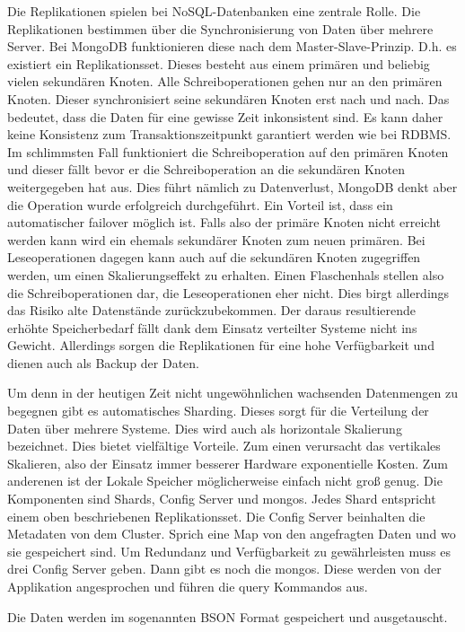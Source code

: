 \documentclass[]{article}
\begin{document}
Die Replikationen spielen bei NoSQL-Datenbanken eine zentrale Rolle. Die
Replikationen bestimmen über die Synchronisierung von Daten über mehrere
Server. Bei MongoDB funktionieren diese nach dem Master-Slave-Prinzip.
D.h. es existiert ein Replikationsset. Dieses besteht aus einem primären
und beliebig vielen sekundären Knoten. Alle Schreiboperationen gehen nur
an den primären Knoten. Dieser synchronisiert seine sekundären Knoten
erst nach und nach. Das bedeutet, dass die Daten für eine gewisse Zeit
inkonsistent sind. Es kann daher keine Konsistenz zum
Transaktionszeitpunkt garantiert werden wie bei RDBMS. Im schlimmsten
Fall funktioniert die Schreiboperation auf den primären Knoten und
dieser fällt bevor er die Schreiboperation an die sekundären Knoten
weitergegeben hat aus. Dies führt nämlich zu Datenverlust, MongoDB denkt
aber die Operation wurde erfolgreich durchgeführt. Ein Vorteil ist, dass
ein automatischer failover möglich ist. Falls also der primäre Knoten
nicht erreicht werden kann wird ein ehemals sekundärer Knoten zum neuen
primären. Bei Leseoperationen dagegen kann auch auf die sekundären
Knoten zugegriffen werden, um einen Skalierungseffekt zu erhalten. Einen
Flaschenhals stellen also die Schreiboperationen dar, die
Leseoperationen eher nicht. Dies birgt allerdings das Risiko alte
Datenstände zurückzubekommen. Der daraus resultierende erhöhte
Speicherbedarf fällt dank dem Einsatz verteilter Systeme nicht ins
Gewicht. Allerdings sorgen die Replikationen für eine hohe Verfügbarkeit
und dienen auch als Backup der Daten.

Um denn in der heutigen Zeit nicht ungewöhnlichen wachsenden Datenmengen
zu begegnen gibt es automatisches Sharding. Dieses sorgt für die
Verteilung der Daten über mehrere Systeme. Dies wird auch als
horizontale Skalierung bezeichnet. Dies bietet vielfältige Vorteile. Zum
einen verursacht das vertikales Skalieren, also der Einsatz immer
besserer Hardware exponentielle Kosten. Zum anderenen ist der Lokale
Speicher möglicherweise einfach nicht groß genug. Die Komponenten sind
Shards, Config Server und mongos. Jedes Shard entspricht einem oben
beschriebenen Replikationsset. Die Config Server beinhalten die
Metadaten von dem Cluster. Sprich eine Map von den angefragten Daten und
wo sie gespeichert sind. Um Redundanz und Verfügbarkeit zu gewährleisten
muss es drei Config Server geben. Dann gibt es noch die mongos. Diese
werden von der Applikation angesprochen und führen die query Kommandos
aus.

Die Daten werden im sogenannten BSON Format gespeichert und
ausgetauscht.
\end{document}
